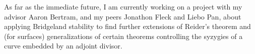 \documentclass[12pt]{article}
\begin{document}
As far as the immediate future, I am currently working on a project with my advisor Aaron Bertram, and my peers Jonathon Fleck and Liebo Pan, about applying Bridgeland stability to find further extensions of Reider's theorem and (for surfaces) generalizations of certain theorems controlling the syzygies of a curve embedded by an adjoint divisor.





\end{document}
